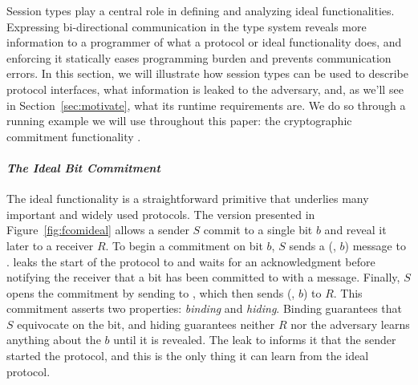 
Session types play a central role in defining and analyzing ideal
functionalities.  Expressing bi-directional communication in the type system
reveals more information to a programmer of what a protocol or ideal
functionality does, and enforcing it statically eases programming burden and
prevents communication errors.  In this section, we will illustrate how session
types can be used to describe protocol interfaces, what information is leaked
to the adversary, and, as we'll see in Section~\ref{sec:motivate}, what its
runtime requirements are.  We do so through a running example we will use
throughout this paper: the cryptographic commitment functionality \Fcom.

\paragraph*{\textbf{\textit{The Ideal Bit Commitment}}}
The ideal functionality \Fcom is a straightforward primitive that underlies
many important and widely used protocols.  The version presented in
Figure~\ref{fig:fcomideal} allows a sender $S$ commit to a single bit $b$ and
reveal it later to a receiver $R$.  To begin a commitment on bit $b$, $S$ sends
a (, $b$) message to \Fcom.  \Fcom leaks the start of the protocol to
\A and waits for an acknowledgment before notifying the receiver that a bit has
been committed to with a  message.  Finally, $S$ opens the
commitment by sending  to \Fcom, which then sends (, $b$) to
$R$.  This commitment asserts two properties: \emph{binding} and \emph{hiding}.
Binding guarantees that $S$ equivocate on the bit, and hiding guarantees
neither $R$ nor the adversary learns anything about the $b$ until it is
revealed.  The leak to \A informs it that the sender started the protocol, and
this is the only thing it can learn from the ideal protocol.


